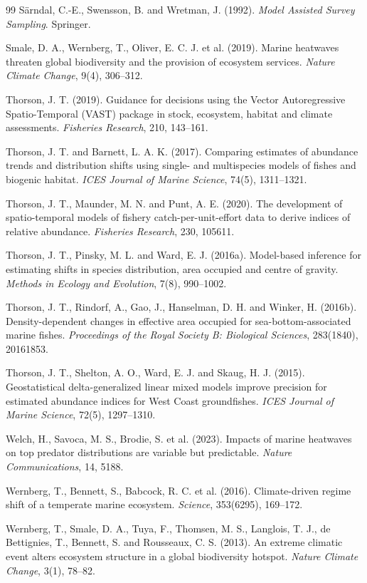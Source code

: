\documentclass[11pt,a4paper]{article}
\begin{document}
\begin{thebibliography}{99}
S\"arndal, C.-E., Swensson, B. and Wretman, J. (1992). \textit{Model Assisted Survey Sampling}. Springer.

Smale, D. A., Wernberg, T., Oliver, E. C. J. et al. (2019). Marine heatwaves threaten global biodiversity and the provision of ecosystem services. \textit{Nature Climate Change}, 9(4), 306--312.

Thorson, J. T. (2019). Guidance for decisions using the Vector Autoregressive Spatio-Temporal (VAST) package in stock, ecosystem, habitat and climate assessments. \textit{Fisheries Research}, 210, 143--161.

Thorson, J. T. and Barnett, L. A. K. (2017). Comparing estimates of abundance trends and distribution shifts using single- and multispecies models of fishes and biogenic habitat. \textit{ICES Journal of Marine Science}, 74(5), 1311--1321.

Thorson, J. T., Maunder, M. N. and Punt, A. E. (2020). The development of spatio-temporal models of fishery catch-per-unit-effort data to derive indices of relative abundance. \textit{Fisheries Research}, 230, 105611.

Thorson, J. T., Pinsky, M. L. and Ward, E. J. (2016a). Model-based inference for estimating shifts in species distribution, area occupied and centre of gravity. \textit{Methods in Ecology and Evolution}, 7(8), 990--1002.

Thorson, J. T., Rindorf, A., Gao, J., Hanselman, D. H. and Winker, H. (2016b). Density-dependent changes in effective area occupied for sea-bottom-associated marine fishes. \textit{Proceedings of the Royal Society B: Biological Sciences}, 283(1840), 20161853.

Thorson, J. T., Shelton, A. O., Ward, E. J. and Skaug, H. J. (2015). Geostatistical delta-generalized linear mixed models improve precision for estimated abundance indices for West Coast groundfishes. \textit{ICES Journal of Marine Science}, 72(5), 1297--1310.

Welch, H., Savoca, M. S., Brodie, S. et al. (2023). Impacts of marine heatwaves on top predator distributions are variable but predictable. \textit{Nature Communications}, 14, 5188.

Wernberg, T., Bennett, S., Babcock, R. C. et al. (2016). Climate-driven regime shift of a temperate marine ecosystem. \textit{Science}, 353(6295), 169--172.

Wernberg, T., Smale, D. A., Tuya, F., Thomsen, M. S., Langlois, T. J., de Bettignies, T., Bennett, S. and Rousseaux, C. S. (2013). An extreme climatic event alters ecosystem structure in a global biodiversity hotspot. \textit{Nature Climate Change}, 3(1), 78--82.

\end{thebibliography}
\end{document}
